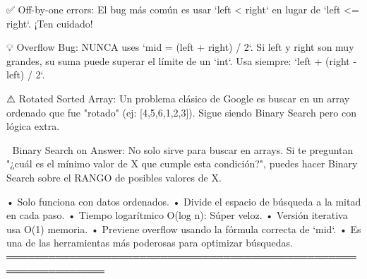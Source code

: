 \begin{dsaentrevistas}

✅ Off-by-one errors: El bug más común es usar `left < right` en lugar
   de `left <= right`. ¡Ten cuidado!

💡 Overflow Bug: NUNCA uses `mid = (left + right) / 2`. Si left y right 
   son muy grandes, su suma puede superar el límite de un `int`. 
   Usa siempre: `left + (right - left) / 2`.

⚠️ Rotated Sorted Array: Un problema clásico de Google es buscar en un
   array ordenado que fue "rotado" (ej: [4,5,6,1,2,3]). Sigue siendo
   Binary Search pero con lógica extra.

🔑 Binary Search on Answer: No solo sirve para buscar en arrays. Si te
   preguntan "¿cuál es el mínimo valor de X que cumple esta condición?",
   puedes hacer Binary Search sobre el RANGO de posibles valores de X.

\end{dsaentrevistas}

\begin{dsaresumen}

• Solo funciona con datos ordenados.
• Divide el espacio de búsqueda a la mitad en cada paso.
• Tiempo logarítmico O(log n): Súper veloz.
• Versión iterativa usa O(1) memoria.
• Previene overflow usando la fórmula correcta de `mid`.
• Es una de las herramientas más poderosas para optimizar búsquedas.
════════════════════════════════════════════════════════════════

\end{dsaresumen}


